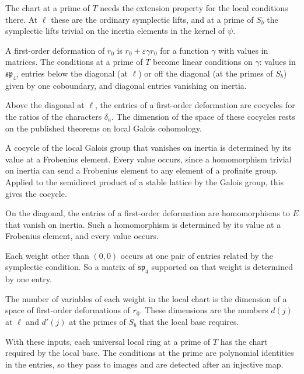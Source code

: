 The chart at a prime of $T$ needs the extension property for the local conditions there. At $\ell$ these are the ordinary symplectic lifts, and at a prime of $S_b$ the symplectic lifts trivial on the inertia elements in the kernel of $\psi$.

A first-order deformation of $r_0$ is $r_0+\varepsilon\gamma r_0$ for a function $\gamma$ with values in matrices. The conditions at a prime of $T$ become linear conditions on $\gamma$: values in $\mathfrak{sp}_4$, entries below the diagonal (at $\ell$) or off the diagonal (at the primes of $S_b$) given by one coboundary, and diagonal entries vanishing on inertia.

Above the diagonal at $\ell$, the entries of a first-order deformation are cocycles for the ratios of the characters $\delta_a$. The dimension of the space of these cocycles rests on the published theorems on local Galois cohomology.

A cocycle of the local Galois group that vanishes on inertia is determined by its value at a Frobenius element. Every value occurs, since a homomorphism trivial on inertia can send a Frobenius element to any element of a profinite group. Applied to the semidirect product of a stable lattice by the Galois group, this gives the cocycle.

On the diagonal, the entries of a first-order deformation are homomorphisms to $E$ that vanish on inertia. Such a homomorphism is determined by its value at a Frobenius element, and every value occurs.

Each weight other than $(0,0)$ occurs at one pair of entries related by the symplectic condition. So a matrix of $\mathfrak{sp}_4$ supported on that weight is determined by one entry.

The number of variables of each weight in the local chart is the dimension of a space of first-order deformations of $r_0$. These dimensions are the numbers $d(j)$ at $\ell$ and $d'(j)$ at the primes of $S_b$ that the local base requires.

With these inputs, each universal local ring at a prime of $T$ has the chart required by the local base. The conditions at the prime are polynomial identities in the entries, so they pass to images and are detected after an injective map.

